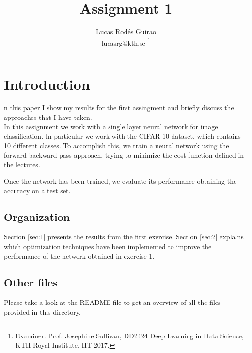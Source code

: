 \documentclass[journal, a4paper]{IEEEtran}
\begin{document}
	\title{Assignment 1}
	\author{Lucas Rod\'es Guirao \\ lucasrg@kth.se
	\thanks{Examiner: Prof. Josephine Sullivan, DD2424 Deep Learning in Data Science, KTH Royal Institute, HT 2017.}}
	\maketitle



\section{Introduction}
n this paper I show my results for the first assingment and briefly discuss the approaches that I have taken. \\

In this assignment we work with a single layer neural network for image classification. In particular we work with the CIFAR-10 dataset, which contains 10 different classes. To accomplish this, we train a neural network using the forward-backward pass approach, trying to minimize the cost function defined in the lectures.

Once the network has been trained, we evaluate its performance obtaining the accuracy on a test set.

\subsection{Organization}
Section \ref{sec:1} presents the results from the first exercise. Section \ref{sec:2} explains which optimization techniques have been implemented to improve the performance of the network obtained in exercise 1.

\subsection{Other files}
Please take a look at the README file to get an overview of all the files provided in this directory.
\end{document}
